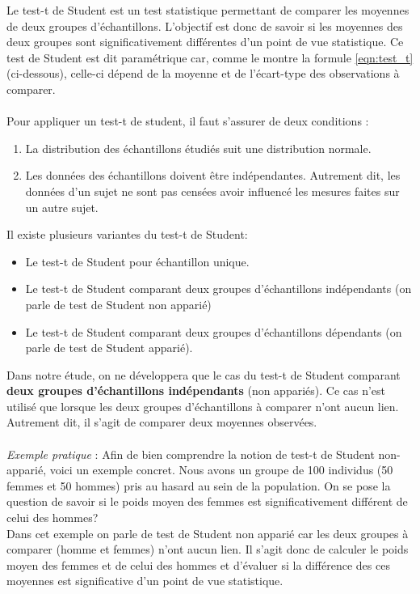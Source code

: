 \documentclass[10pt, oneside, a4paper]{article}
\begin{document}
Le test-t de Student est un test statistique permettant de comparer les moyennes de deux groupes d’échantillons. L'objectif est donc de savoir si les moyennes des deux groupes sont significativement différentes d'un point de vue statistique. Ce test de Student est dit paramétrique car, comme le montre la formule \ref{eqn:test_t} (ci-dessous), celle-ci dépend de la moyenne et de l’écart-type des observations à comparer. \\ \\
Pour appliquer un test-t de student, il faut s'assurer de deux conditions : 
\begin{enumerate}
\item La distribution des échantillons étudiés suit une distribution normale.
\item  Les données des échantillons doivent être indépendantes. Autrement dit, les données d'un sujet ne sont pas censées avoir influencé les mesures faites sur un autre sujet. \\
\end{enumerate}
Il existe plusieurs variantes du test-t de Student:
\begin{itemize}
\item Le test-t de Student pour échantillon unique.
\item Le test-t de Student comparant deux groupes d’échantillons indépendants (on parle de test de Student non apparié)
\item Le test-t de Student comparant deux groupes d’échantillons dépendants (on parle de test de Student apparié). \\
\end{itemize}
Dans notre étude, on ne développera que le cas du test-t de Student comparant \textbf{deux groupes d'échantillons indépendants} (non appariés). Ce cas n'est utilisé que lorsque les deux groupes d'échantillons à comparer n'ont aucun lien. Autrement dit, il s'agit de comparer deux moyennes observées. \\ \\
\textit{Exemple pratique} : Afin de bien comprendre la notion de test-t de Student non-apparié, voici un exemple concret.
Nous avons un groupe de 100 individus (50 femmes et 50 hommes) pris au hasard au sein de la population. On se pose la question de savoir si le poids moyen des femmes est significativement différent de celui des hommes? \\
Dans cet exemple on parle de test de Student non apparié car les deux groupes à comparer (homme et femmes) n’ont aucun lien. Il s’agit donc de calculer le poids moyen des femmes et de celui des hommes et d’évaluer si la différence des ces moyennes est significative d'un point de vue statistique.
\end{document}
